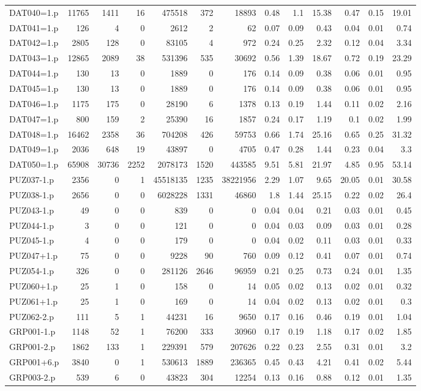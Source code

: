 \begin{table}[H]
\begin{adjustwidth}{-0.4in}{-0.5in}
\begin{tabular}{| l || r | r | r || r | r | r || r | r | r | r | r | r |}
DAT040=1.p&11765&1411&16&475518&372&18893&0.48&1.1&15.38&0.47&0.15&19.01\\
DAT041=1.p&126&4&0&2612&2&62&0.07&0.09&0.43&0.04&0.01&0.74\\
DAT042=1.p&2805&128&0&83105&4&972&0.24&0.25&2.32&0.12&0.04&3.34\\
DAT043=1.p&12865&2089&38&531396&535&30692&0.56&1.39&18.67&0.72&0.19&23.29\\
DAT044=1.p&130&13&0&1889&0&176&0.14&0.09&0.38&0.06&0.01&0.95\\
DAT045=1.p&130&13&0&1889&0&176&0.14&0.09&0.38&0.06&0.01&0.95\\
DAT046=1.p&1175&175&0&28190&6&1378&0.13&0.19&1.44&0.11&0.02&2.16\\
DAT047=1.p&800&159&2&25390&16&1857&0.24&0.17&1.19&0.1&0.02&1.99\\
DAT048=1.p&16462&2358&36&704208&426&59753&0.66&1.74&25.16&0.65&0.25&31.32\\
DAT049=1.p&2036&648&19&43897&0&4705&0.47&0.28&1.44&0.23&0.04&3.3\\
DAT050=1.p&65908&30736&2252&2078173&1520&443585&9.51&5.81&21.97&4.85&0.95&53.14\\
PUZ037-1.p&2356&0&1&45518135&1235&38221956&2.29&1.07&9.65&20.05&0.01&30.58\\
PUZ038-1.p&2656&0&0&6028228&1331&46860&1.8&1.44&25.15&0.22&0.02&26.4\\
PUZ043-1.p&49&0&0&839&0&0&0.04&0.04&0.21&0.03&0.01&0.45\\
PUZ044-1.p&3&0&0&121&0&0&0.04&0.03&0.09&0.03&0.01&0.28\\
PUZ045-1.p&4&0&0&179&0&0&0.04&0.02&0.11&0.03&0.01&0.33\\
PUZ047+1.p&75&0&0&9228&90&760&0.09&0.12&0.41&0.07&0.01&0.74\\
PUZ054-1.p&326&0&0&281126&2646&96959&0.21&0.25&0.73&0.24&0.01&1.35\\
PUZ060+1.p&25&1&0&158&0&14&0.05&0.02&0.13&0.02&0.01&0.32\\
PUZ061+1.p&25&1&0&169&0&14&0.04&0.02&0.13&0.02&0.01&0.3\\
PUZ062-2.p&111&5&1&44231&16&9650&0.17&0.16&0.46&0.19&0.01&1.04\\
GRP001-1.p&1148&52&1&76200&333&30960&0.17&0.19&1.18&0.17&0.02&1.85\\
GRP001-2.p&1862&133&1&229391&579&207626&0.22&0.23&2.55&0.31&0.01&3.2\\
GRP001+6.p&3840&0&1&530613&1889&236365&0.45&0.43&4.21&0.41&0.02&5.44\\
GRP003-2.p&539&6&0&43823&304&12254&0.13&0.16&0.88&0.12&0.01&1.35\\

\end{tabular}
\end{adjustwidth}
\end{table}
